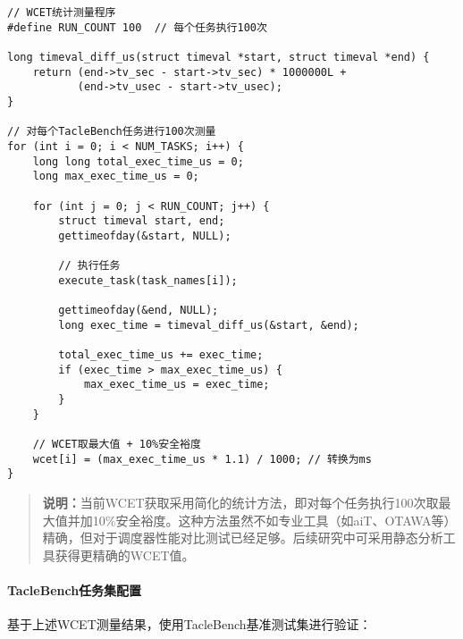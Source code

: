 \begin{tcolorbox} [
    enhanced,
    colback=blue!5,
    colframe=blue!40!black,
    leftrule=3mm,
    rightrule=0mm,
    toprule=0mm,
    bottomrule=0mm,
    arc=2mm,
    left=5mm,
    right=5mm,
    top=3mm,
    bottom=3mm,
    fonttitle=\bfseries,
    title=\textbf{WCET测量方法}
]
\begin{lstlisting}[basicstyle=\footnotesize\fontfamily{zi4}\selectfont, showstringspaces=false]
// WCET统计测量程序
#define RUN_COUNT 100  // 每个任务执行100次

long timeval_diff_us(struct timeval *start, struct timeval *end) {
    return (end->tv_sec - start->tv_sec) * 1000000L + 
           (end->tv_usec - start->tv_usec);
}

// 对每个TacleBench任务进行100次测量
for (int i = 0; i < NUM_TASKS; i++) {
    long long total_exec_time_us = 0;
    long max_exec_time_us = 0;
    
    for (int j = 0; j < RUN_COUNT; j++) {
        struct timeval start, end;
        gettimeofday(&start, NULL);
        
        // 执行任务
        execute_task(task_names[i]);
        
        gettimeofday(&end, NULL);
        long exec_time = timeval_diff_us(&start, &end);
        
        total_exec_time_us += exec_time;
        if (exec_time > max_exec_time_us) {
            max_exec_time_us = exec_time;
        }
    }
    
    // WCET取最大值 + 10%安全裕度
    wcet[i] = (max_exec_time_us * 1.1) / 1000; // 转换为ms
}
\end{lstlisting}
\end{tcolorbox}

\begin{quote}
\textbf{说明：}当前WCET获取采用简化的统计方法，即对每个任务执行100次取最大值并加10\%安全裕度。这种方法虽然不如专业工具（如aiT、OTAWA等）精确，但对于调度器性能对比测试已经足够。后续研究中可采用静态分析工具获得更精确的WCET值。
\end{quote}

\paragraph{TacleBench任务集配置}

基于上述WCET测量结果，使用TacleBench基准测试集进行验证：

